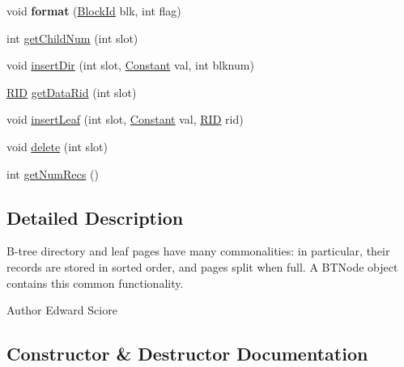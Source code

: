 \begin{DoxyCompactItemize}
void {\bfseries format} (\hyperlink{classsimpledb_1_1file_1_1BlockId}{Block\+Id} blk, int flag)
\item 
int \hyperlink{classsimpledb_1_1index_1_1btree_1_1BTPage_a94c6ab7b56f3456083e2d18d0b5cd036}{get\+Child\+Num} (int slot)
\item 
void \hyperlink{classsimpledb_1_1index_1_1btree_1_1BTPage_a0ea20d043ba60421c1e2b242b56f4986}{insert\+Dir} (int slot, \hyperlink{classsimpledb_1_1query_1_1Constant}{Constant} val, int blknum)
\item 
\hyperlink{classsimpledb_1_1record_1_1RID}{R\+ID} \hyperlink{classsimpledb_1_1index_1_1btree_1_1BTPage_a58b8e14ece178dfaa8032f20eb3236d5}{get\+Data\+Rid} (int slot)
\item 
void \hyperlink{classsimpledb_1_1index_1_1btree_1_1BTPage_a61e46367916cca912b7c37968826e01b}{insert\+Leaf} (int slot, \hyperlink{classsimpledb_1_1query_1_1Constant}{Constant} val, \hyperlink{classsimpledb_1_1record_1_1RID}{R\+ID} rid)
\item 
void \hyperlink{classsimpledb_1_1index_1_1btree_1_1BTPage_a202eb8527fc7ff66b5b1e328c00df15d}{delete} (int slot)
\item 
int \hyperlink{classsimpledb_1_1index_1_1btree_1_1BTPage_aba2b632141026a579a0066aca2302b0a}{get\+Num\+Recs} ()
\end{DoxyCompactItemize}


\subsection{Detailed Description}
B-\/tree directory and leaf pages have many commonalities\+: in particular, their records are stored in sorted order, and pages split when full. A B\+T\+Node object contains this common functionality. \begin{DoxyAuthor}{Author}
Edward Sciore 
\end{DoxyAuthor}


\subsection{Constructor \& Destructor Documentation}
\mbox{\label{classsimpledb_1_1index_1_1btree_1_1BTPage_a1ef33a79d3b3bb2f7bf9859cb046df02}} 
